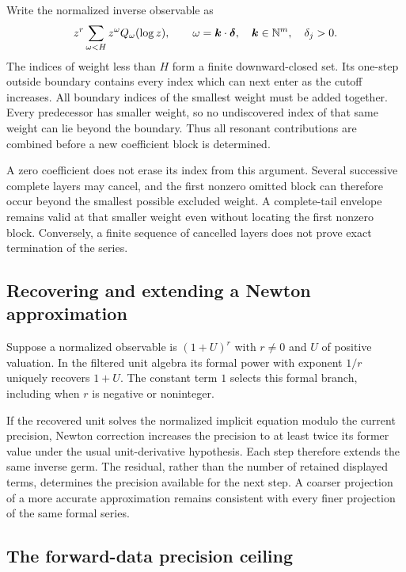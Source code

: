 Write the normalized inverse observable as
\[
 z^r\sum_{\omega<H}z^\omega Q_\omega(\log z),
 \qquad \omega=\boldsymbol k\cdot\boldsymbol\delta,\quad
 \boldsymbol k\in\mathbb N^m,\quad \delta_j>0.
\]
The indices of weight less than $H$ form a finite downward-closed set.
Its one-step outside boundary contains every index which can next enter
as the cutoff increases. All boundary indices of the smallest weight must
be added together. Every predecessor has smaller weight, so no undiscovered
index of that same weight can lie beyond the boundary. Thus all resonant
contributions are combined before a new coefficient block is determined.

A zero coefficient does not erase its index from this argument. Several
successive complete layers may cancel, and the first nonzero omitted block
can therefore occur beyond the smallest possible excluded weight. A
complete-tail envelope remains valid at that smaller weight even without
locating the first nonzero block. Conversely, a finite sequence of cancelled
layers does not prove exact termination of the series.

\subsection{Recovering and extending a Newton approximation}

Suppose a normalized observable is $(1+U)^r$ with $r\ne0$ and $U$ of
positive valuation. In the filtered unit algebra its formal power with
exponent $1/r$ uniquely recovers $1+U$. The constant term $1$ selects this
formal branch, including when $r$ is negative or noninteger.

If the recovered unit solves the normalized implicit equation modulo the
current precision, Newton correction increases the precision to at least
twice its former value under the usual unit-derivative hypothesis. Each
step therefore extends the same inverse germ. The residual, rather than
the number of retained displayed terms, determines the precision available
for the next step. A coarser projection of a more accurate approximation
remains consistent with every finer projection of the same formal series.

\subsection{The forward-data precision ceiling}


